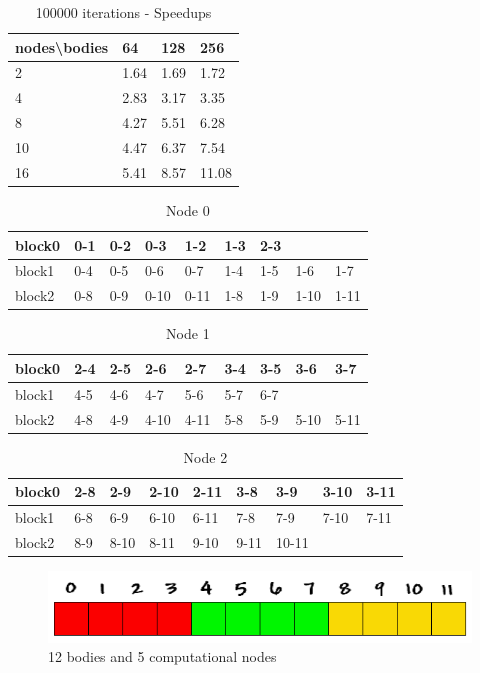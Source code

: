 \documentclass[a4paper]{article}
\begin{document}
	
\begin{table}[]
\centering
\caption{100000 iterations - Speedups}
\label{t5}
\begin{tabular}{l|l|l|l}
nodes\textbackslash bodies & 64 & 128 & 256 \\ \hline
2 & 1.64 & 1.69 & 1.72 \\ \hline
4 & 2.83 & 3.17 & 3.35 \\ \hline
8 & 4.27 & 5.51 & 6.28 \\ \hline
10 & 4.47 & 6.37 & 7.54 \\ \hline
16 & 5.41 & 8.57 & 11.08 \\ \hline
\end{tabular}
\end{table}

\begin{table}[]
\centering
\caption{Node 0}
\label{my-label}
\begin{tabular}{l|llllllll}
block0 & 0-1 & 0-2 & 0-3  & 1-2  & 1-3 & 2-3 &      &      \\ \hline
block1 & 0-4 & 0-5 & 0-6  & 0-7  & 1-4 & 1-5 & 1-6  & 1-7  \\ \hline
block2 & 0-8 & 0-9 & 0-10 & 0-11 & 1-8 & 1-9 & 1-10 & 1-11
\end{tabular}
\end{table}

\begin{table}[]
\centering
\caption{Node 1}
\label{my-label}
\begin{tabular}{l|llllllll}
block0 & 2-4 & 2-5 & 2-6  & 2-7  & 3-4 & 3-5 & 3-6  & 3-7  \\ \hline
block1 & 4-5 & 4-6 & 4-7  & 5-6  & 5-7 & 6-7 &      &      \\ \hline
block2 & 4-8 & 4-9 & 4-10 & 4-11 & 5-8 & 5-9 & 5-10 & 5-11
\end{tabular}
\end{table}

\begin{table}[]
\centering
\caption{Node 2}
\label{my-label}
\begin{tabular}{l|llllllll}
block0 & 2-8 & 2-9  & 2-10 & 2-11 & 3-8  & 3-9   & 3-10 & 3-11 \\ \hline
block1 & 6-8 & 6-9  & 6-10 & 6-11 & 7-8  & 7-9   & 7-10 & 7-11 \\ \hline
block2 & 8-9 & 8-10 & 8-11 & 9-10 & 9-11 & 10-11 &      &     
\end{tabular}
\end{table}

\begin{figure}[ht]
  \centering\includegraphics[width=0.6\linewidth]{array_procs_3}
  \caption{12 bodies and 5 computational nodes}
  \label{fig:5nodes}
\end{figure}
\end{document}
